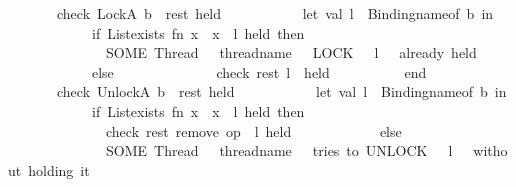\begin{isabellebody}
\ \ \ \ \ \ {\isacharbar}{\kern0pt}\ check\ {\isacharparenleft}{\kern0pt}LockA\ b\ {\isacharcolon}{\kern0pt}{\isacharcolon}{\kern0pt}\ rest{\isacharparenright}{\kern0pt}\ held\ {\isacharequal}{\kern0pt}\isanewline
\ \ \ \ \ \ \ \ \ \ let\ val\ l\ {\isacharequal}{\kern0pt}\ Binding{\isachardot}{\kern0pt}name{\isacharunderscore}{\kern0pt}of\ b\ in\isanewline
\ \ \ \ \ \ \ \ \ \ \ \ if\ List{\isachardot}{\kern0pt}exists\ {\isacharparenleft}{\kern0pt}fn\ x\ {\isacharequal}{\kern0pt}{\isachargreater}{\kern0pt}\ x\ {\isacharequal}{\kern0pt}\ l{\isacharparenright}{\kern0pt}\ held\ then\ \isanewline
\ \ \ \ \ \ \ \ \ \ \ \ \ \ SOME\ {\isacharparenleft}{\kern0pt}{\isachardoublequote}{\kern0pt}Thread\ {\isachardoublequote}{\kern0pt}\ {\isacharcircum}{\kern0pt}\ thread{\isacharunderscore}{\kern0pt}name\ {\isacharcircum}{\kern0pt}\ {\isachardoublequote}{\kern0pt}{\isacharcolon}{\kern0pt}\ LOCK\ {\isachardoublequote}{\kern0pt}\ {\isacharcircum}{\kern0pt}\ l\ {\isacharcircum}{\kern0pt}\ {\isachardoublequote}{\kern0pt}\ already\ held{\isachardoublequote}{\kern0pt}{\isacharparenright}{\kern0pt}\isanewline
\ \ \ \ \ \ \ \ \ \ \ \ else\isanewline
\ \ \ \ \ \ \ \ \ \ \ \ \ \ check\ rest\ {\isacharparenleft}{\kern0pt}l\ {\isacharcolon}{\kern0pt}{\isacharcolon}{\kern0pt}\ held{\isacharparenright}{\kern0pt}\isanewline
\ \ \ \ \ \ \ \ \ \ end\isanewline
\ \ \ \ \ \ {\isacharbar}{\kern0pt}\ check\ {\isacharparenleft}{\kern0pt}UnlockA\ b\ {\isacharcolon}{\kern0pt}{\isacharcolon}{\kern0pt}\ rest{\isacharparenright}{\kern0pt}\ held\ {\isacharequal}{\kern0pt}\isanewline
\ \ \ \ \ \ \ \ \ \ let\ val\ l\ {\isacharequal}{\kern0pt}\ Binding{\isachardot}{\kern0pt}name{\isacharunderscore}{\kern0pt}of\ b\ in\isanewline
\ \ \ \ \ \ \ \ \ \ \ \ if\ List{\isachardot}{\kern0pt}exists\ {\isacharparenleft}{\kern0pt}fn\ x\ {\isacharequal}{\kern0pt}{\isachargreater}{\kern0pt}\ x\ {\isacharequal}{\kern0pt}\ l{\isacharparenright}{\kern0pt}\ held\ then\isanewline
\ \ \ \ \ \ \ \ \ \ \ \ \ \ check\ rest\ {\isacharparenleft}{\kern0pt}remove\ {\isacharparenleft}{\kern0pt}op\ {\isacharequal}{\kern0pt}{\isacharparenright}{\kern0pt}\ l\ held{\isacharparenright}{\kern0pt}\isanewline
\ \ \ \ \ \ \ \ \ \ \ \ else\isanewline
\ \ \ \ \ \ \ \ \ \ \ \ \ \ SOME\ {\isacharparenleft}{\kern0pt}{\isachardoublequote}{\kern0pt}Thread\ {\isachardoublequote}{\kern0pt}\ {\isacharcircum}{\kern0pt}\ thread{\isacharunderscore}{\kern0pt}name\ {\isacharcircum}{\kern0pt}\ {\isachardoublequote}{\kern0pt}{\isacharcolon}{\kern0pt}\ tries\ to\ UNLOCK\ {\isachardoublequote}{\kern0pt}\ {\isacharcircum}{\kern0pt}\ l\ {\isacharcircum}{\kern0pt}\ {\isachardoublequote}{\kern0pt}\ without\ holding\ it{\isachardoublequote}{\kern0pt}{\isacharparenright}{\kern0pt}\isanewline

\end{isabellebody}
